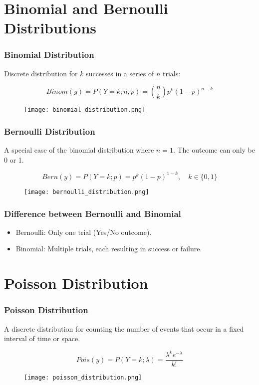 \documentclass{beamer}
\begin{document}
\section{Binomial and Bernoulli Distributions}

\begin{frame}
    \frametitle{Binomial Distribution}
    Discrete distribution for $k$ successes in a series of $n$ trials:
    
    \[
    Binom(y) = P(Y = k; n, p) = \binom{n}{k} p^k(1 - p)^{n-k}
    \]
    
    \begin{figure}
        \centering
        \texttt{[image: binomial\_distribution.png]}
    \end{figure}
\end{frame}

\begin{frame}
    \frametitle{Bernoulli Distribution}
    A special case of the binomial distribution where $n = 1$. The outcome can only be 0 or 1.
    
    \[
    Bern(y) = P(Y = k; p) = p^k(1-p)^{1-k}, \quad k \in \{0,1\}
    \]
    
    \begin{figure}
        \centering
        \texttt{[image: bernoulli\_distribution.png]}
    \end{figure}
\end{frame}

\begin{frame}
    \frametitle{Difference between Bernoulli and Binomial}
    \begin{itemize}
        \item Bernoulli: Only one trial (Yes/No outcome).
        \item Binomial: Multiple trials, each resulting in success or failure.
    \end{itemize}
\end{frame}

\section{Poisson Distribution}

\begin{frame}
    \frametitle{Poisson Distribution}
    A discrete distribution for counting the number of events that occur in a fixed interval of time or space.
    
    \[
    Pois(y) = P(Y = k; \lambda) = \frac{\lambda^k e^{-\lambda}}{k!}
    \]
    
    \begin{figure}
        \centering
        \texttt{[image: poisson\_distribution.png]}
    \end{figure}
\end{frame}
\end{document}
